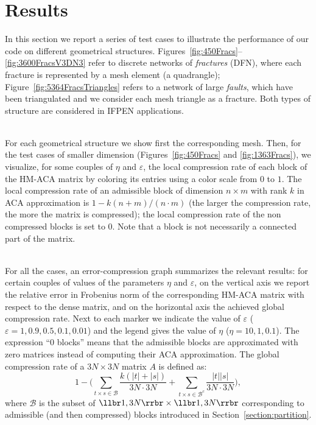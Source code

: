 


\section{Results}
\label{sec:results}

In this section we report a series of test cases to illustrate the performance of our code on different geometrical structures.
Figures~\ref{fig:450Fracs}--\ref{fig:3600FracsV3DN3} refer to discrete networks of \emph{fractures} (DFN), where each fracture is represented by a mesh element (a quadrangle);    
Figure~\ref{fig:5364FracsTriangles} refers to a network of large \emph{faults}, which have been triangulated and we consider each mesh triangle as a fracture. Both types of structure are considered in IFPEN applications.

\quad\\
For each geometrical structure we show first the corresponding mesh.
Then, for the test cases of smaller dimension (Figures~\ref{fig:450Fracs} and \ref{fig:1363Fracs}), we visualize, for some couples of $\eta$ and $\varepsilon$, the local compression rate of each block of the HM-ACA matrix by coloring its entries using a color scale from $0$ to $1$. The local compression rate of an admissible block of dimension $n\times m$ with rank $k$ in ACA approximation is $1-k(n+m)/(n\cdot m)$ (the larger the compression rate, the more the matrix is compressed); the local compression rate of the non compressed blocks is set to $0$. Note that a block is not necessarily a connected part of the matrix.

\quad\\
For all the cases, an error-compression graph summarizes the relevant results: for certain couples of values of the parameters $\eta$ and $\varepsilon$, on the vertical axis we report the relative error in Frobenius norm of the corresponding HM-ACA matrix with respect to the dense matrix, and on the horizontal axis the achieved global compression rate. Next to each marker we indicate the value of $\varepsilon$ ($\varepsilon=1, 0.9, 0.5, 0.1, 0.01$) and the legend gives the value of $\eta$ ($\eta=10,1,0.1$). The expression ``0 blocks'' means that the admissible blocks are approximated with zero matrices instead of computing their ACA approximation.
The global compression rate of a $3N\times 3N$ matrix $A$ is defined as:
\[
1- \Biggl(\sum_{t \times s \in \mathscr{B}}{\frac{k(\lvert t \rvert + \lvert s \rvert)}{3N\cdot3N} } + 
\sum_{t \times s \in \mathscr{B}^c}{\frac{\lvert t \rvert \lvert s \rvert}{3N\cdot3N} } \Biggr),
\]
where $\mathscr{B}$ is the subset of $\llbr 1,3N\rrbr\times \llbr 1,3N\rrbr$ corresponding to admissible (and then compressed) blocks introduced in Section~\ref{section:partition}.

